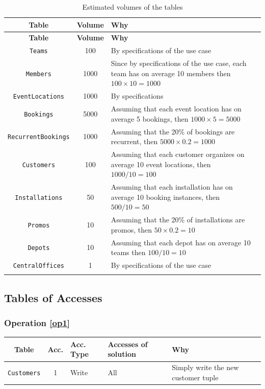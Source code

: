 \begin{longtable}{|c|c|p{8cm}|}
    \hline
    \textbf{Table} & \textbf{Volume} & \textbf{Why} \\
    \hline
    \endfirsthead
    \hline
    \textbf{Table} & \textbf{Volume} & \textbf{Why} \\
    \hline
    \endhead
    \texttt{Teams} & 100 & By specifications of the use case \\
    \texttt{Members} & 1000 & Since by specifications of the use case, each team has on average 10 members then $100 \times 10 = 1000$ \\
    \texttt{EventLocations} & 1000 & By specifications \\ %
    \texttt{Bookings} & 5000 & Assuming that each event location has on average 5 bookings, then $1000 \times 5 = 5000$ \\
    \texttt{RecurrentBookings} & 1000 & Assuming that the 20\% of bookings are recurrent, then $5000 \times 0.2 = 1000$ \\
    \texttt{Customers} & 100 & Assuming that each customer organizes on average 10 event locations, then $1000 / 10 = 100$ \\
    \texttt{Installations} & 50 & Assuming that each installation has on average 10 booking instances, then $500 / 10 = 50$ \\
    \texttt{Promos} & 10 & Assuming that the 20\% of installations are promos, then $50 \times 0.2 = 10$ \\
    \texttt{Depots} & 10 & Assuming that each depot has on average 10 teams then $100 / 10 = 10$ \\
    \texttt{CentralOffices} & 1 & By specifications of the use case \\
    \hline
    \caption{Estimated volumes of the tables}
    \label{tab:volumes}
\end{longtable}

\subsection{Tables of Accesses}

\subsubsection{Operation \ref{op1}}

\begin{longtable}[H]{|c|c|p{1cm}|p{2cm}|p{8cm}|}
    \hline
    \textbf{Table} & \textbf{Acc.} & \textbf{Acc. Type} & \textbf{Accesses of solution} & \textbf{Why} \\
    \hline
    \texttt{Customers} & 1 & Write & All & Simply write the new customer tuple \\
    \hline
\end{longtable}

